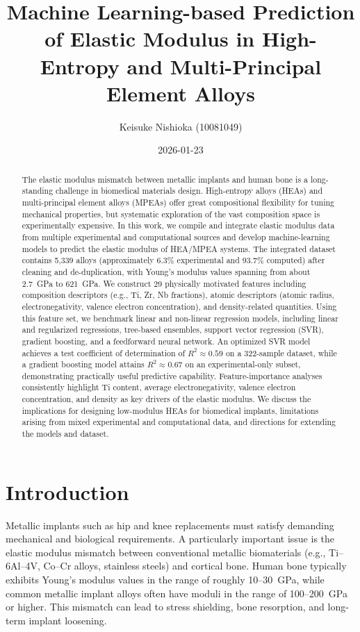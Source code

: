 \documentclass[11pt,a4paper]{article}
\title{Machine Learning-based Prediction of Elastic Modulus in High-Entropy and Multi-Principal Element Alloys}
\author{Keisuke Nishioka (10081049)}
\date{2026-01-23}
\begin{document}
\maketitle

\begin{abstract}
The elastic modulus mismatch between metallic implants and human bone is a long-standing challenge in biomedical materials design. High-entropy alloys (HEAs) and multi-principal element alloys (MPEAs) offer great compositional flexibility for tuning mechanical properties, but systematic exploration of the vast composition space is experimentally expensive. In this work, we compile and integrate elastic modulus data from multiple experimental and computational sources and develop machine-learning models to predict the elastic modulus of HEA/MPEA systems. The integrated dataset contains 5{,}339 alloys (approximately 6.3\% experimental and 93.7\% computed) after cleaning and de-duplication, with Young's modulus values spanning from about 2.7~GPa to 621~GPa. We construct 29 physically motivated features including composition descriptors (e.g., Ti, Zr, Nb fractions), atomic descriptors (atomic radius, electronegativity, valence electron concentration), and density-related quantities. Using this feature set, we benchmark linear and non-linear regression models, including linear and regularized regressions, tree-based ensembles, support vector regression (SVR), gradient boosting, and a feedforward neural network. An optimized SVR model achieves a test coefficient of determination of $R^2 \approx 0.59$ on a 322-sample dataset, while a gradient boosting model attains $R^2 \approx 0.67$ on an experimental-only subset, demonstrating practically useful predictive capability. Feature-importance analyses consistently highlight Ti content, average electronegativity, valence electron concentration, and density as key drivers of the elastic modulus. We discuss the implications for designing low-modulus HEAs for biomedical implants, limitations arising from mixed experimental and computational data, and directions for extending the models and dataset.
\end{abstract}

\section{Introduction}

Metallic implants such as hip and knee replacements must satisfy demanding mechanical and biological requirements. A particularly important issue is the elastic modulus mismatch between conventional metallic biomaterials (e.g., Ti--6Al--4V, Co--Cr alloys, stainless steels) and cortical bone. Human bone typically exhibits Young's modulus values in the range of roughly 10--30~GPa, while common metallic implant alloys often have moduli in the range of 100--200~GPa or higher. This mismatch can lead to stress shielding, bone resorption, and long-term implant loosening.
\end{document}
